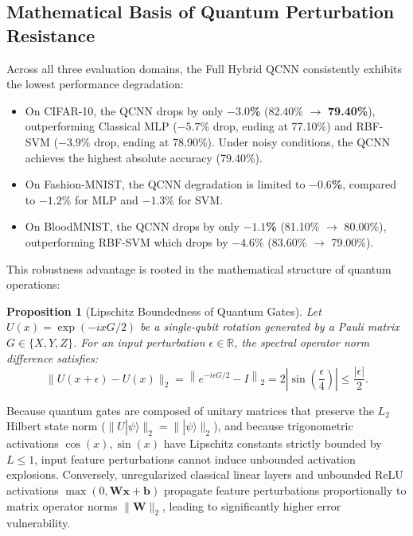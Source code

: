 \documentclass[10pt,twocolumn,twoside,a4paper]{article}
\newcommand{\ket}[1]{|#1\rangle}
\newtheorem{proposition}{Proposition}
\begin{document}
\subsection{Mathematical Basis of Quantum Perturbation Resistance}
Across all three evaluation domains, the Full Hybrid QCNN consistently exhibits the lowest performance degradation:
\begin{itemize}
    \item On CIFAR-10, the QCNN drops by only \textbf{$-3.0$\%} (82.40\% $\to$ \textbf{79.40\%}), outperforming Classical MLP ($-5.7$\% drop, ending at 77.10\%) and RBF-SVM ($-3.9$\% drop, ending at 78.90\%). Under noisy conditions, the QCNN achieves the highest absolute accuracy (79.40\%).
    \item On Fashion-MNIST, the QCNN degradation is limited to \textbf{$-0.6$\%}, compared to $-1.2$\% for MLP and $-1.3$\% for SVM.
    \item On BloodMNIST, the QCNN drops by only \textbf{$-1.1$\%} (81.10\% $\to$ 80.00\%), outperforming RBF-SVM which drops by $-4.6$\% (83.60\% $\to$ 79.00\%).
\end{itemize}

This robustness advantage is rooted in the mathematical structure of quantum operations:
\begin{proposition}[Lipschitz Boundedness of Quantum Gates]
Let $U(x) = \exp(-i x G / 2)$ be a single-qubit rotation generated by a Pauli matrix $G \in \{X, Y, Z\}$. For an input perturbation $\epsilon \in \mathbb{R}$, the spectral operator norm difference satisfies:
\begin{equation}
    \| U(x + \epsilon) - U(x) \|_2 = \left\| e^{-i \epsilon G / 2} - I \right\|_2 = 2 \left| \sin\left(\frac{\epsilon}{4}\right) \right| \le \frac{|\epsilon|}{2}.
\end{equation}
\end{proposition}
Because quantum gates are composed of unitary matrices that preserve the $L_2$ Hilbert state norm ($\|U\ket{\psi}\|_2 = \|\ket{\psi}\|_2$), and because trigonometric activations $\cos(x), \sin(x)$ have Lipschitz constants strictly bounded by $L \le 1$, input feature perturbations cannot induce unbounded activation explosions. Conversely, unregularized classical linear layers and unbounded ReLU activations $\max(0, \mathbf{W}\mathbf{x} + \mathbf{b})$ propagate feature perturbations proportionally to matrix operator norms $\|\mathbf{W}\|_2$, leading to significantly higher error vulnerability.

\end{document}
